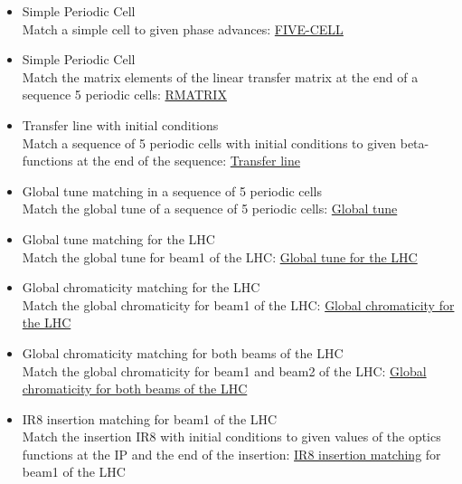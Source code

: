 \begin{itemize}
   \item Simple Periodic Cell\\
     Match a simple cell to given phase advances: 
     \href{http://cern.ch/madx/madX/examples/match/5cell/job.5cell.madx}{FIVE-CELL}
     
   \item Simple Periodic Cell\\
     Match the matrix elements of the linear transfer matrix at the
     end of a sequence 5 periodic cells:  
     \href{http://cern.ch/madx/madX/examples/match/r-matrix/job.r-matrix.madx}{RMATRIX}
     
   \item Transfer line with initial conditions\\
     Match a sequence of 5 periodic cells with initial conditions  to
     given beta-functions at the end of the sequence:  
     \href{http://cern.ch/madx/madX/examples/match/line/job.line.madx}{Transfer line}
     
   \item Global tune matching in a sequence of 5 periodic cells \\
     Match the global tune of a sequence of 5 periodic cells: 
     \href{http://cern.ch/madx/madX/examples/match/global-tune/job.global-tune.madx}{Global tune}
     
   \item Global tune matching for the LHC\\
     Match the global tune for beam1 of the LHC: 
     \href{http://cern.ch/madx/madX/examples/match/lhc.tune/job.lhc.tune.madx}{Global tune for the LHC}
     
   \item Global chromaticity matching for the LHC\\
     Match the global chromaticity for beam1 of the LHC: 
     \href{http://cern.ch/madx/madX/examples/match/lhc.chromaticity/job.lhc.chromaticity.madx}{Global
       chromaticity for the LHC} 
     
   \item Global chromaticity matching for both beams of the LHC\\
     Match the global chromaticity for beam1 and beam2 of the LHC: 
     \href{http://cern.ch/madx/madX/examples/match/lhc.2chromaticity/job.lhc.2chromaticity.madx}{Global
       chromaticity for both beams of the LHC} 
     
   \item IR8 insertion matching for beam1 of the LHC\\
     Match the insertion IR8 with initial conditions to given values
     of the optics  functions at the IP and the end of the insertion:  
     \href{http://cern.ch/madx/madX/examples/match/lhc.insertion/job.lhc.insertion.madx}{IR8
       insertion matching} for beam1 of the LHC 
     

\end{itemize}
